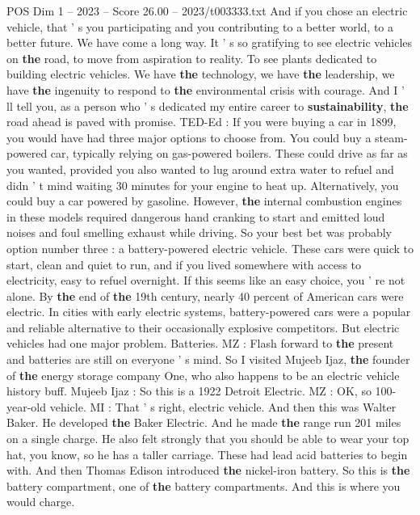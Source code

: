 \begin{textsample}{POS Dim 1 – 2023 – Score 26.00 – 2023/t003333.txt}
And if you chose an electric vehicle, that ' s you participating and you contributing to a better world, to a better future.
We have come a long way.
It ' s so gratifying to see electric vehicles on \textbf{the} road, to move from aspiration to reality.
To see plants dedicated to building electric vehicles.
We have \textbf{the} technology, we have \textbf{the} leadership, we have \textbf{the} ingenuity to respond to \textbf{the} environmental crisis with courage.
And I ' ll tell you, as a person who ' s dedicated my entire career to \textbf{sustainability}, \textbf{the} road ahead is paved with promise.
TED-Ed : If you were buying a car in 1899, you would have had three major options to choose from.
You could buy a steam-powered car, typically relying on gas-powered boilers.
These could drive as far as you wanted, provided you also wanted to lug around extra water to refuel and didn ' t mind waiting 30 minutes for your engine to heat up.
Alternatively, you could buy a car powered by gasoline.
However, \textbf{the} internal combustion engines in these models required dangerous hand cranking to start and emitted loud noises and foul smelling exhaust while driving.
So your best bet was probably option number three : a battery-powered electric vehicle.
These cars were quick to start, clean and quiet to run, and if you lived somewhere with access to electricity, easy to refuel overnight.
If this seems like an easy choice, you ' re not alone.
By \textbf{the} end of \textbf{the} 19th century, nearly 40 percent of American cars were electric.
In cities with early electric systems, battery-powered cars were a popular and reliable alternative to their occasionally explosive competitors.
But electric vehicles had one major problem.
Batteries.
MZ : Flash forward to \textbf{the} present and batteries are still on everyone ' s mind.
So I visited Mujeeb Ijaz, \textbf{the} founder of \textbf{the} energy storage company One, who also happens to be an electric vehicle history buff.
Mujeeb Ijaz : So this is a 1922 Detroit Electric.
MZ : OK, so 100-year-old vehicle.
MI : That ' s right, electric vehicle.
And then this was Walter Baker.
He developed \textbf{the} Baker Electric.
And he made \textbf{the} range run 201 miles on a single charge.
He also felt strongly that you should be able to wear your top hat, you know, so he has a taller carriage.
These had lead acid batteries to begin with.
And then Thomas Edison introduced \textbf{the} nickel-iron battery.
So this is \textbf{the} battery compartment, one of \textbf{the} battery compartments.
And this is where you would charge.

\end{textsample}
